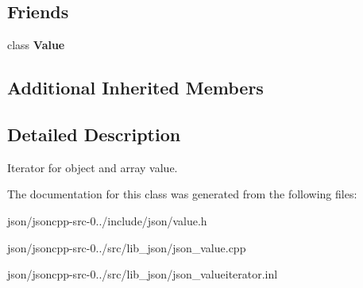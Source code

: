\subsection*{Friends}
\begin{DoxyCompactItemize}
\item 
\hypertarget{class_json_1_1_value_iterator_aeceedf6e1a7d48a588516ce2b1983d6f}{class {\bfseries Value}}\label{class_json_1_1_value_iterator_aeceedf6e1a7d48a588516ce2b1983d6f}

\end{DoxyCompactItemize}
\subsection*{Additional Inherited Members}


\subsection{Detailed Description}
Iterator for object and array value. 

The documentation for this class was generated from the following files\+:\begin{DoxyCompactItemize}
\item 
json/jsoncpp-\/src-\/0../include/json/value.\+h\item 
json/jsoncpp-\/src-\/0../src/lib\+\_\+json/json\+\_\+value.\+cpp\item 
json/jsoncpp-\/src-\/0../src/lib\+\_\+json/json\+\_\+valueiterator.\+inl\end{DoxyCompactItemize}
